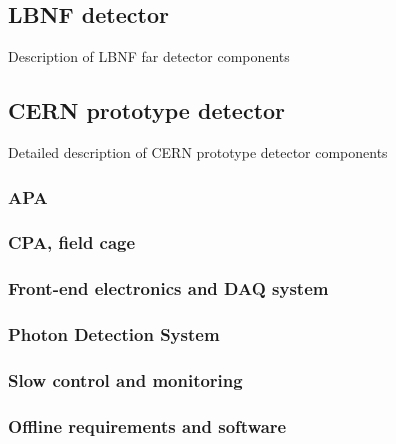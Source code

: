 \subsection{LBNF detector}
Description of LBNF far detector components

\subsection{CERN prototype detector}
Detailed description of CERN prototype detector components
\subsubsection{APA}
\subsubsection{CPA, field cage}
\subsubsection{Front-end electronics and DAQ system}
\subsubsection{Photon Detection System}
\subsubsection{Slow control and monitoring}
\subsubsection{Offline requirements and software}

